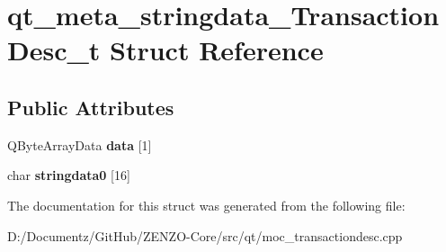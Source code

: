 \hypertarget{structqt__meta__stringdata___transaction_desc__t}{}\section{qt\+\_\+meta\+\_\+stringdata\+\_\+\+Transaction\+Desc\+\_\+t Struct Reference}
\label{structqt__meta__stringdata___transaction_desc__t}
\subsection*{Public Attributes}
\begin{DoxyCompactItemize}
\item 
\mbox{\label{structqt__meta__stringdata___transaction_desc__t_ad32514f69c3398e9ba92b3fe73cf3874}} 
Q\+Byte\+Array\+Data {\bfseries data} \mbox{[}1\mbox{]}
\item 
\mbox{\label{structqt__meta__stringdata___transaction_desc__t_ad477a9c1bfdea9bc0f0786e19b0d3d70}} 
char {\bfseries stringdata0} \mbox{[}16\mbox{]}
\end{DoxyCompactItemize}


The documentation for this struct was generated from the following file\+:\begin{DoxyCompactItemize}
\item 
D\+:/\+Documentz/\+Git\+Hub/\+Z\+E\+N\+Z\+O-\/\+Core/src/qt/moc\+\_\+transactiondesc.\+cpp\end{DoxyCompactItemize}
